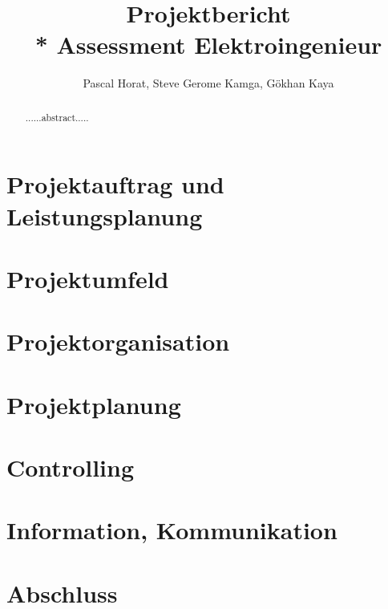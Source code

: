 \documentclass[10pt]{article}
\title{Projektbericht\\* Assessment Elektroingenieur}
\author{Pascal Horat, Steve Gerome Kamga, Gökhan Kaya}
\begin{document}
\maketitle

\begin{abstract}
......abstract.....
\end{abstract}

\tableofcontents

\section{Projektauftrag und Leistungsplanung}

\section{Projektumfeld}

\section{Projektorganisation}

\section{Projektplanung}

\section{Controlling}

\section{Information, Kommunikation}

\section{Abschluss}
\end{document}
